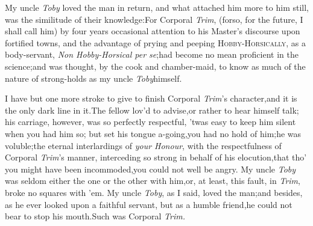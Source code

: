 \documentclass{article}
\begin{document}
My uncle \textit{Toby} loved the man in return, and what attached
him more to him still, was the similitude of their\break
knowledge:\tsh For Corporal \textit{Trim}, (for\break so, for the
future, I shall call him) by\break
four years occasional attention to his\break
Master’s discourse upon fortified towns,\break
and the advantage of prying and peeping\break
{}
\textsc{Hobby-Horsically}, as a body-servant,
\textit{Non Hobby-Horsical per se};\tsh had become no mean
proficient in the science;\break and was thought, by the cook and
cham\-ber-maid, to know as much of the nature of
strong-holds as my uncle \textit{Toby}\break himself.\\

\newpage
I have but one more stroke to give to finish Corporal
\textit{Trim}’s character,\tsh and it is the only dark
line in it.\tsk The fellow lov’d to advise,\tsk or rather to
hear himself talk; his carriage, however, was so perfectly
respectful, ’twas easy to keep him silent when you had him
so; but set his tongue a-going,\tsk you had no hold of
him;\tsk he was voluble;\tsk the eternal interlardings of
\textit{your Honour}, with the respectfulness of Corporal
\textit{Trim}’s manner, interceding so strong in behalf of his
elocution,\tsk that tho’ you might have been
incommoded,\tsk you could not well be angry. My uncle
\textit{Toby} was seldom either the one or the other with
him,\tsk\break or, at least, this fault, in \textit{Trim}, broke no
squares with ’em. My uncle \textit{Toby}, as I said, loved the
man;\tsh and besides, as he ever looked upon a faithful
servant,\tsk\break
but as a humble friend,\tsk he could not bear to
stop his mouth.\tsh Such was Corporal \textit{Trim.}
\end{document}
